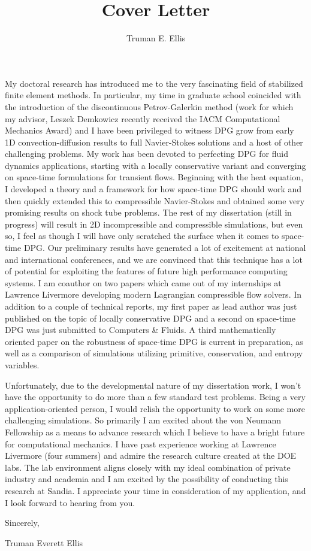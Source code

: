 \documentclass[12pt,letterpaper]{article}
\title{Cover Letter}
\author{Truman E. Ellis}
\date{}
\begin{document}
\maketitle

My doctoral research has introduced me to the very fascinating field of stabilized finite element methods.
In particular, my time in graduate school coincided with the introduction of the discontinuous Petrov-Galerkin method 
(work for which my advisor, Leszek Demkowicz recently received the IACM Computational Mechanics Award)
and I have been privileged to witness DPG grow from early 1D convection-diffusion results to 
full Navier-Stokes solutions and a host of other challenging problems.
My work has been devoted to perfecting DPG for fluid dynamics applications, starting with a locally conservative variant and 
converging on space-time formulations for transient flows.
Beginning with the heat equation, I developed a theory and a framework for how space-time DPG should work and then quickly extended this to compressible
Navier-Stokes and obtained some very promising results on shock tube problems.
The rest of my dissertation (still in progress) will result in 2D incompressible and compressible simulations, but
even so, I feel as though I will have only scratched the surface when it comes to space-time DPG.
Our preliminary results have generated a lot of excitement at national and international conferences,
and we are convinced that this technique has a lot of potential for exploiting the features of future high performance computing systems.
I am coauthor on two papers which came out of my internships at Lawrence Livermore developing modern Lagrangian compressible flow solvers.
In addition to a couple of technical reports, my first paper as lead author was just published on the topic of locally conservative DPG 
and a second on space-time DPG was just submitted to Computers \& Fluids.
A third mathematically oriented paper on the robustness of space-time DPG is current in preparation,
as well as a comparison of simulations utilizing primitive, conservation, and entropy variables.

Unfortunately, due to the developmental nature of my dissertation work, I won't have the opportunity to do more than a few standard test problems.
Being a very application-oriented person, I would relish the opportunity to work on some more challenging simulations.
So primarily I am excited about the von Neumann Fellowship as a means to advance research which I believe to have a bright future for computational mechanics.
I have past experience working at Lawrence Livermore (four summers) and admire the research culture created at the DOE labs. 
The lab environment aligns closely with my ideal combination of private industry and academia 
and I am excited by the possibility of conducting this research at Sandia.
I appreciate your time in consideration of my application, and I look forward to hearing from you.

\medskip
Sincerely,

\medskip
Truman Everett Ellis
\end{document}
